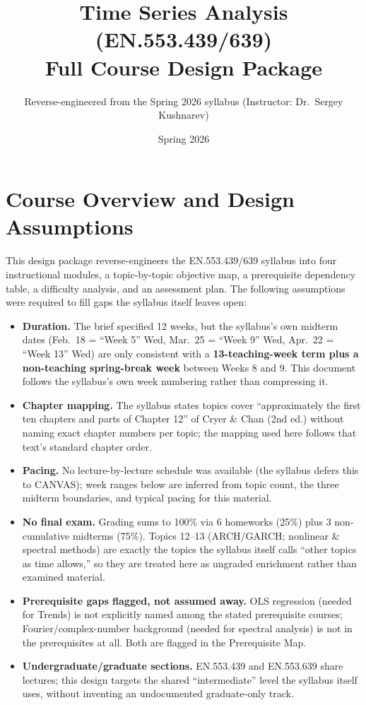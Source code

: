 \documentclass[11pt]{article}
\title{Time Series Analysis (EN.553.439/639) \\ \large Full Course Design Package}
\author{Reverse-engineered from the Spring 2026 syllabus (Instructor: Dr.\ Sergey Kushnarev)}
\date{Spring 2026}
\begin{document}
\maketitle
\tableofcontents

\section{Course Overview and Design Assumptions}

This design package reverse-engineers the EN.553.439/639 syllabus into four instructional modules, a topic-by-topic objective map, a prerequisite dependency table, a difficulty analysis, and an assessment plan. The following assumptions were required to fill gaps the syllabus itself leaves open:

\begin{itemize}
\item \textbf{Duration.} The brief specified 12 weeks, but the syllabus's own midterm dates (Feb.\ 18 = ``Week 5'' Wed, Mar.\ 25 = ``Week 9'' Wed, Apr.\ 22 = ``Week 13'' Wed) are only consistent with a \textbf{13-teaching-week term plus a non-teaching spring-break week} between Weeks 8 and 9. This document follows the syllabus's own week numbering rather than compressing it.
\item \textbf{Chapter mapping.} The syllabus states topics cover ``approximately the first ten chapters and parts of Chapter 12'' of Cryer \& Chan (2nd ed.) without naming exact chapter numbers per topic; the mapping used here follows that text's standard chapter order.
\item \textbf{Pacing.} No lecture-by-lecture schedule was available (the syllabus defers this to CANVAS); week ranges below are inferred from topic count, the three midterm boundaries, and typical pacing for this material.
\item \textbf{No final exam.} Grading sums to 100\% via 6 homeworks (25\%) plus 3 non-cumulative midterms (75\%). Topics 12--13 (ARCH/GARCH; nonlinear \& spectral methods) are exactly the topics the syllabus itself calls ``other topics as time allows,'' so they are treated here as ungraded enrichment rather than examined material.
\item \textbf{Prerequisite gaps flagged, not assumed away.} OLS regression (needed for Trends) is not explicitly named among the stated prerequisite courses; Fourier/complex-number background (needed for spectral analysis) is not in the prerequisites at all. Both are flagged in the Prerequisite Map.
\item \textbf{Undergraduate/graduate sections.} EN.553.439 and EN.553.639 share lectures; this design targets the shared ``intermediate'' level the syllabus itself uses, without inventing an undocumented graduate-only track.
\end{itemize}
\end{document}
